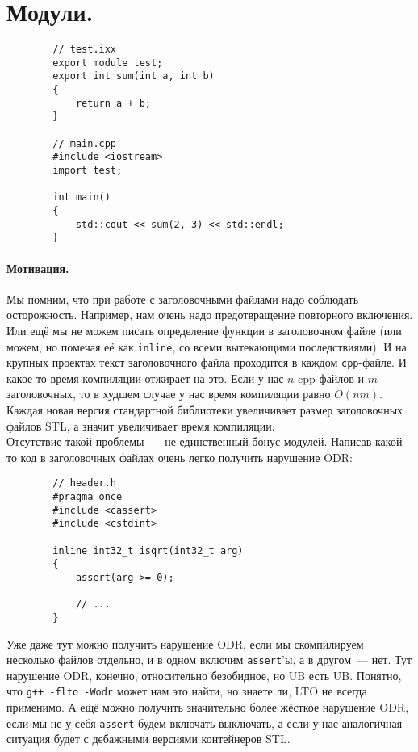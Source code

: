 \documentclass{article}
\begin{document}
    \section{Модули.}
    \begin{verbatim}
        // test.ixx
        export module test;
        export int sum(int a, int b)
        {
            return a + b;
        }

        // main.cpp
        #include <iostream>
        import test;
        
        int main()
        {
            std::cout << sum(2, 3) << std::endl;
        }
    \end{verbatim}
    \paragraph{Мотивация.}
    Мы помним, что при работе с заголовочными файлами надо соблюдать осторожность. Например, нам очень надо предотвращение повторного включения. Или ещё мы не можем писать определение функции в заголовочном файле (или можем, но помечая её как \texttt{inline}, со всеми вытекающими последствиями). И на крупных проектах текст заголовочного файла проходится в каждом \texttt{cpp}-файле. И какое-то время компиляции отжирает на это. Если у нас $n$ cpp-файлов и $m$ заголовочных, то в худшем случае у нас время компиляции равно $O(nm)$. Каждая новая версия стандартной библиотеки увеличивает размер заголовочных файлов STL, а значит увеличивает время компиляции.\\
    Отсутствие такой проблемы~--- не единственный бонус модулей. Написав какой-то код в заголовочных файлах очень легко получить нарушение ODR:
    \begin{verbatim}
        // header.h
        #pragma once
        #include <cassert>
        #include <cstdint>
        
        inline int32_t isqrt(int32_t arg)
        {
            assert(arg >= 0);

            // ...
        }
    \end{verbatim}
    Уже даже тут можно получить нарушение ODR, если мы скомпилируем несколько файлов отдельно, и в одном включим \texttt{assert}'ы, а в другом~--- нет. Тут нарушение ODR, конечно, относительно безобидное, но UB есть UB. Понятно, что \texttt{g++ -flto -Wodr} может нам это найти, но знаете ли, LTO не всегда применимо. А ещё можно получить значительно более жёсткое нарушение ODR, если мы не у себя \texttt{assert} будем включать-выключать, а если у нас аналогичная ситуация будет с дебажными версиями контейнеров STL.\\
\end{document}
